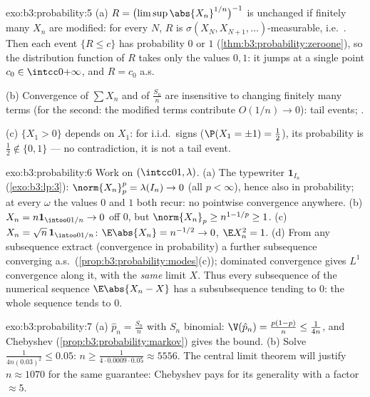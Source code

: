\begin{solution}{exo:b3:probability:5}
(a) $R = \bigl(\limsup\abs{X_n}^{1/n}\bigr)^{-1}$ is
unchanged if finitely many $X_n$ are modified: for every $N$,
$R$ is $\sigma(X_N, X_{N+1}, \dots)$-measurable, i.e.\
. Then each event $\{R \leq c\}$ has
probability $0$ or $1$ (\cref{thm:b3:probability:zeroone}),
so the distribution function of $R$ takes only the values
$0, 1$: it jumps at a single point $c_0 \in
\intcc0{+\infty}$, and $R = c_0$ a.s.

(b) Convergence of $\sum X_n$ and of $\frac{S_n}n$ are
insensitive to changing finitely many terms (for the second:
the modified terms contribute $O(1/n) \to 0$): tail events;
.

(c) $\{X_1 > 0\}$ depends on $X_1$: for i.i.d.\ signs
($\P(X_1 = \pm1) = \frac12$), its probability is $\frac12
\notin \{0,1\}$ --- no contradiction, it is not a tail
event.
\end{solution}

\begin{solution}{exo:b3:probability:6}
Work on $(\intcc01, \lambda)$.
(a) The typewriter $\mathbf 1_{I_n}$
(\cref{exo:b3:lp:3}): $\norm{X_n}_p^p = \lambda(I_n) \to 0$
(all $p < \infty$), hence also in probability; at every
$\omega$ the values $0$ and $1$ both recur: no pointwise
convergence anywhere.
(b) $X_n = n\mathbf 1_{\intoo0{1/n}} \to 0$ off $0$, but
$\norm{X_n}_p \geq n^{1 - 1/p} \geq 1$.
(c) $X_n = \sqrt n\,\mathbf 1_{\intoo0{1/n}}$: $\E\abs{X_n} =
n^{-1/2} \to 0$, $\E X_n^2 = 1$.
(d) From any subsequence extract (convergence in
probability) a further subsequence converging a.s.\
(\cref{prop:b3:probability:modes}(c)); dominated convergence
gives $L^1$ convergence along it, with the \emph{same} limit
$X$. Thus every subsequence of the numerical sequence
$\E\abs{X_n - X}$ has a subsubsequence tending to $0$: the
whole sequence tends to $0$.
\end{solution}

\begin{solution}{exo:b3:probability:7}
(a) $\hat p_n = \frac{S_n}n$ with $S_n$ binomial: $\V(\hat
p_n) = \frac{p(1-p)}n \leq \frac1{4n}$, and Chebyshev
(\cref{prop:b3:probability:markov}) gives the bound.
(b) Solve $\frac1{4n(0.03)^2} \leq 0.05$: $n \geq
\frac{1}{4\cdot0.0009\cdot0.05} \approx 5556$. The central
limit theorem will justify $n \approx 1070$ for the same
guarantee: Chebyshev pays for its generality with a factor
$\approx 5$.
\end{solution}

